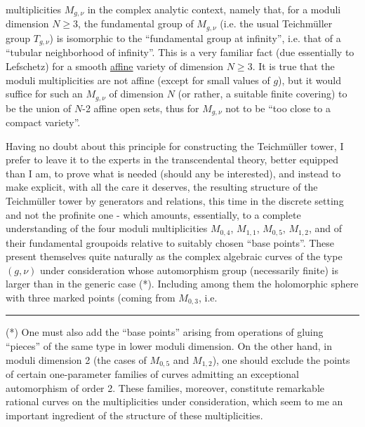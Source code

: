
multiplicities $M_{g,\nu}$ in the complex analytic context,
namely that, for a moduli dimension $N \geq 3$, the fundamental
group of $M_{g,\nu}$ (i.e. the usual Teichmüller group $T_{g,\nu}$)
is isomorphic to the ``fundamental group at infinity'', i.e. that of a
``tubular neighborhood of infinity''. This is a very familiar fact
(due essentially to Lefschetz) for a smooth \uline{affine} variety of
dimension $N \geq 3$. It is true that the moduli multiplicities are
not affine (except for small values of $g$), but it would suffice
for such an $M_{g,\nu}$ of dimension $N$ (or rather, a suitable finite
covering) to be the union of $N$-2 affine open sets, thus
for $M_{g,\nu}$ not to be ``too close to a compact variety''.

Having no doubt about this principle for constructing the
Teichmüller tower, I prefer to leave it to the experts in the transcendental
theory, better equipped than I am, to prove what is needed
(should any be interested), and instead to make explicit,
with all the care it deserves, the resulting structure of the
Teichmüller tower by generators and relations, this time in the
discrete setting and not the profinite one - which amounts, essentially,
to a complete understanding of the four moduli multiplicities
$M_{0,4}$, $M_{1,1}$, $M_{0,5}$, $M_{1,2}$, and of their fundamental groupoids relative
to suitably chosen ``base points''. These present themselves
quite naturally as the complex algebraic curves of the type
$(g,\nu)$ under consideration whose automorphism group (necessarily
finite) is larger than in the generic case (*). Including among them the
holomorphic sphere with three marked points (coming from $M_{0,3}$, i.e.

\rule{4cm}{0.4pt}

(*) One must also add the ``base points'' arising from operations
of gluing ``pieces'' of the same type in lower moduli dimension.
On the other hand, in moduli dimension 2 (the cases of $M_{0,5}$ and $M_{1,2}$),
one should exclude the points of certain one-parameter families
of curves admitting an exceptional automorphism of order 2. These
families, moreover, constitute remarkable rational curves on the multiplicities
under consideration, which seem to me an important ingredient
of the structure of these multiplicities.


